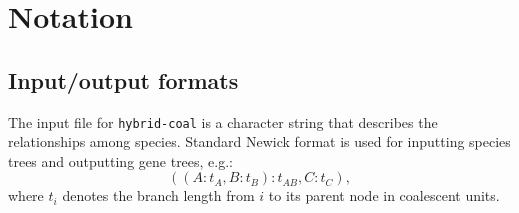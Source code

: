 \section{Notation}

\subsection{Input/output formats}\label{coal_man:coal_input}
The input file for {\tt hybrid-coal} is a character string that describes the relationships among species. Standard Newick format is used for inputting species trees and outputting
gene trees, e.g.:
\begin{equation}
((A:t_A,B:t_B):t_{AB},C:t_C)\label{coal_man:no_root},
\end{equation}
where $t_i$ denotes the branch length from $i$ to its parent node in coalescent units.

